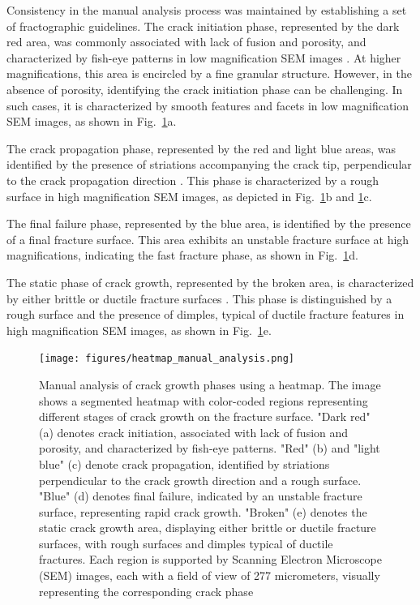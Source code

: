 \documentclass{ieeeaccess}
\begin{document}
Consistency in the manual analysis process was maintained by establishing a set of fractographic guidelines. The crack initiation phase, represented by the dark red area, was commonly associated with lack of fusion and porosity, and characterized by fish-eye patterns in low magnification SEM images \cite{gunther2017fatigue}. At higher magnifications, this area is encircled by a fine granular structure. However, in the absence of porosity, identifying the crack initiation phase can be challenging. In such cases, it is characterized by smooth features and facets in low magnification SEM images, as shown in Fig.~\ref{fig:heatmap_manual_analysis}a.

The crack propagation phase, represented by the red and light blue areas, was identified by the presence of striations accompanying the crack tip, perpendicular to the crack propagation direction \cite{mcevily2010fatigue}. This phase is characterized by a rough surface in high magnification SEM images, as depicted in Fig.~\ref{fig:heatmap_manual_analysis}b and \ref{fig:heatmap_manual_analysis}c.


The final failure phase, represented by the blue area, is identified by the presence of a final fracture surface. This area exhibits an unstable fracture surface at high magnifications, indicating the fast fracture phase, as shown in Fig.~\ref{fig:heatmap_manual_analysis}d.

The static phase of crack growth, represented by the broken area, is characterized by either brittle or ductile fracture surfaces \cite{pineau2016failure}. This phase is distinguished by a rough surface and the presence of dimples, typical of ductile fracture features in high magnification SEM images, as shown in Fig.~\ref{fig:heatmap_manual_analysis}e.

\begin{figure}[!t]
\centering
\texttt{[image: figures/heatmap\_manual\_analysis.png]}
\caption{Manual analysis of crack growth phases using a heatmap. The image shows a segmented heatmap with color-coded regions representing different stages of crack growth on the fracture surface. "Dark red" (a) denotes crack initiation, associated with lack of fusion and porosity, and characterized by fish-eye patterns. "Red" (b) and "light blue" (c) denote crack propagation, identified by striations perpendicular to the crack growth direction and a rough surface. "Blue" (d) denotes final failure, indicated by an unstable fracture surface, representing rapid crack growth. "Broken" (e) denotes the static crack growth area, displaying either brittle or ductile fracture surfaces, with rough surfaces and dimples typical of ductile fractures. Each region is supported by Scanning Electron Microscope (SEM) images, each with a field of view of 277 micrometers, visually representing the corresponding crack phase}
\label{fig:heatmap_manual_analysis}
\end{figure}
\end{document}
